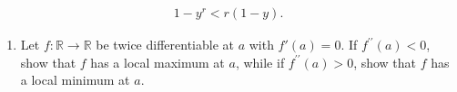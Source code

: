 \documentclass[letterpaper,10pt,english]{jupyterBook}
\begin{document}
\begin{equation*}
\begin{split}
1 - y^r < r(1 - y).
\end{split}
\end{equation*}\label{\detokenize{Problems:id53}}\begin{enumerate}
%
\setcounter{enumi}{52}
\item {} 
\sphinxAtStartPar
Let \(f:\mathbb{R} \rightarrow \mathbb{R}\) be twice differentiable at \(a\) with \(f'(a) = 0\). If \(f^{\prime \prime}(a) < 0\), show that \(f\) has a local maximum at \(a\), while if \(f^{\prime \prime}(a) > 0\), show that \(f\) has a local minimum at \(a\).

\end{enumerate}
\end{document}
